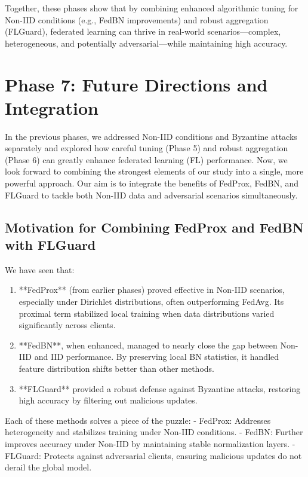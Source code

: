 \documentclass[12pt,a4paper]{report}
\begin{document}
Together, these phases show that by combining enhanced algorithmic tuning for Non-IID conditions (e.g., FedBN improvements) and robust aggregation (FLGuard), federated learning can thrive in real-world scenarios—complex, heterogeneous, and potentially adversarial—while maintaining high accuracy.


\bigskip

\chapter{Phase 7: Future Directions and Integration}

In the previous phases, we addressed Non-IID conditions and Byzantine attacks separately and explored how careful tuning (Phase 5) and robust aggregation (Phase 6) can greatly enhance federated learning (FL) performance. Now, we look forward to combining the strongest elements of our study into a single, more powerful approach. Our aim is to integrate the benefits of FedProx, FedBN, and FLGuard to tackle both Non-IID data and adversarial scenarios simultaneously.

\section{Motivation for Combining FedProx and FedBN with FLGuard}

We have seen that:
\begin{enumerate}
	\item **FedProx** (from earlier phases) proved effective in Non-IID scenarios, especially under Dirichlet distributions, often outperforming FedAvg. Its proximal term stabilized local training when data distributions varied significantly across clients.
	\item **FedBN**, when enhanced, managed to nearly close the gap between Non-IID and IID performance. By preserving local BN statistics, it handled feature distribution shifts better than other methods.
	\item **FLGuard** provided a robust defense against Byzantine attacks, restoring high accuracy by filtering out malicious updates.
\end{enumerate}

Each of these methods solves a piece of the puzzle:
- FedProx: Addresses heterogeneity and stabilizes training under Non-IID conditions.
- FedBN: Further improves accuracy under Non-IID by maintaining stable normalization layers.
- FLGuard: Protects against adversarial clients, ensuring malicious updates do not derail the global model.
\end{document}
